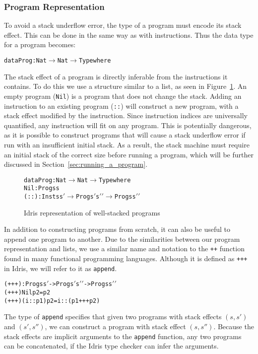 \subsubsection{Program Representation}
To avoid a stack underflow error, the type of a program must encode its stack effect. This can be done in the same way as with instructions. Thus the data type for a program becomes:
\begin{alltt}
data Prog : Nat \(\rightarrow\) Nat \(\rightarrow\) Type where
\end{alltt}
The stack effect of a program is directly inferable from the instructions it contains. To do this we use a structure similar to a list, as seen in Figure~\ref{fig:idris_impl_of_prg}. An empty program (\texttt{Nil}) is a program that does not change the stack. Adding an instruction to an existing program (\texttt{::}) will construct a new program, with a stack effect modified by the instruction. Since instruction indices are universally quantified, any instruction will fit on any program. This is potentially dangerous, as it is possible to construct programs that will cause a stack underflow error if run with an insufficient initial stack. As a result, the stack machine must require an initial stack of the correct size before running a program, which will be further discussed in Section~\ref{sec:running_a_program}.

\begin{figure}
\begin{alltt}
data Prog : Nat \(\rightarrow\) Nat \(\rightarrow\) Type where
  Nil  : Prog s s
  (::) : Inst s s\('\) \(\rightarrow\) Prog s\('\) s\('\)\('\) \(\rightarrow\) Prog s s\('\)\('\)
\end{alltt}
\caption{Idris representation of well-stacked programs}
\label{fig:idris_impl_of_prg}
\end{figure}

In addition to constructing programs from scratch, it can also be useful to append one program to another. Due to the similarities between our program representation and lists, we use a similar name and notation to the \texttt{++} function found in many functional programming languages. Although it is defined as \texttt{+++} in Idris, we will refer to it as \texttt{append}.

\begin{alltt}
(+++) : Prog s s\('\) -> Prog s\('\) s\('\)\('\) -> Prog s s\('\)\('\)
(+++) Nil p2       = p2
(+++) (i :: p1) p2 = i :: (p1 +++ p2)
\end{alltt}

The type of \texttt{append} specifies that given two programs with stack effects $(s, s')$ and $(s', s'')$, we can construct a program with stack effect $(s, s'')$. Because the stack effects are implicit arguments to the \texttt{append} function, any two programs can be concatenated, if the Idris type checker can infer the arguments.
